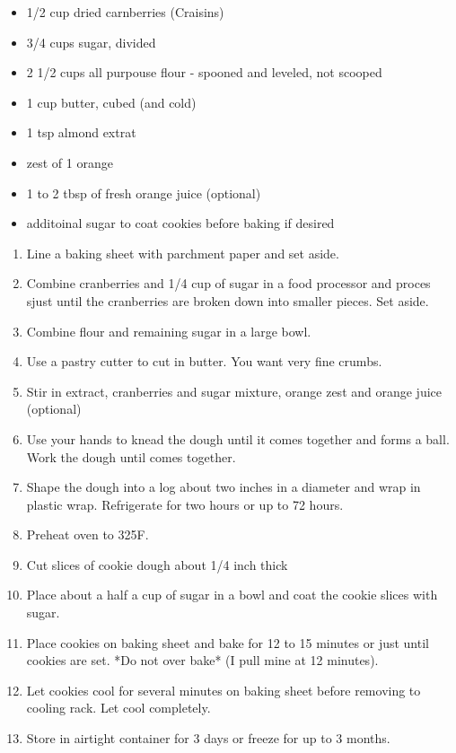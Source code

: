 \documentclass{article}
\begin{document}
\begin{framed}
\begin{itemize}
    \item 1/2 cup dried carnberries (Craisins)
    \item 3/4 cups sugar, divided
    \item 2 1/2 cups all purpouse flour - spooned and leveled, not scooped
    \item 1 cup butter, cubed (and cold)
    \item 1 tsp almond extrat
    \item zest of 1 orange
    \item 1 to 2 tbsp of fresh orange juice (optional)
    \item additoinal sugar to coat cookies before baking if desired
\end{itemize}
\end{framed}

\begin{enumerate}
    \item  
        Line a baking sheet with parchment paper and set aside.
    \item 
        Combine cranberries and 1/4 cup of sugar in a food processor and proces sjust until the cranberries are broken down into smaller pieces. Set aside.
    \item  
        Combine flour and remaining sugar in a large bowl.
    \item 
        Use a pastry cutter to cut in butter. You want very fine crumbs.
    \item 
        Stir in extract, cranberries and sugar mixture, orange zest and orange juice (optional)
    \item  
        Use your hands to knead the dough until it comes together and forms a ball. Work the dough until comes together.
    \item  
        Shape the dough into a log about two inches in a diameter and wrap in plastic wrap. Refrigerate for two hours or up to 72 hours.
    \item 
        Preheat oven to 325F.
    \item  
        Cut slices of cookie dough about 1/4 inch thick
    \item  
        Place about a half a cup of sugar in a bowl and coat the cookie slices with sugar.
    \item  
        Place cookies on baking sheet and bake for 12 to 15 minutes or just until cookies are set. *Do not over bake* (I pull mine at 12 minutes).
    \item 
        Let cookies cool for several minutes on baking sheet before removing to cooling rack. Let cool completely.
    \item  
        Store in airtight container for 3 days or freeze for up to 3 months.
\end{enumerate}
\newpage
\end{document}
